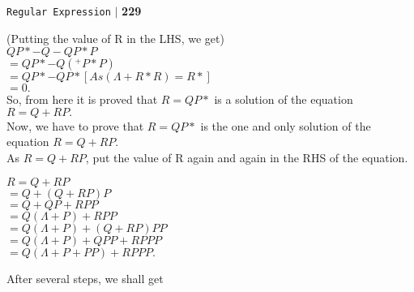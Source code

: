 \documentclass[9pt]{article}
\begin{document}
\begin{flushright}
 \texttt{Regular Expression} \hspace*{0.10cm}\textbf{$|$} \textbf{229}\hspace*{0.5cm}
\end{flushright}

\vspace*{0.5cm}
(Putting the value of R in the LHS, we get)\\

\vspace*{0.2cm}
\hspace*{4cm} $QP* - Q - QP* P$ \\
\hspace*{4cm} $= QP* - Q(^ + P* P)$ \\
\hspace*{4cm} $= QP* - QP* [As (\Lambda + R*R) = R*]$ \\
\hspace*{4cm} $= 0.$ \\

\vspace*{0.2cm}
So, from here it is proved that $R = QP*$ is a solution of the equation $R = Q + RP.$ \\
Now, we have to prove that $R = QP*$ is the one and only solution of the equation $R = Q + RP$. \\
As $R = Q + RP$, put the value of R again and again in the RHS of the equation.\\
\vspace*{0.2cm}

\hspace*{3.1cm} $R = Q + RP$ \\
\hspace*{3.5cm} $= Q + (Q + RP)P$ \\
\hspace*{3.5cm} $= Q + QP + RPP$ \\
\hspace*{3.5cm} $= Q(\Lambda + P) + RPP$ \\
\hspace*{3.5cm} $= Q(\Lambda + P) + (Q + RP)PP$ \\
\hspace*{3.5cm} $= Q(\Lambda + P) + QPP + RPPP$ \\
\hspace*{3.5cm} $= Q(\Lambda + P + PP) + RPPP.$ \\
\vspace*{0.1cm}

After several steps, we shall get\\
\end{document}
